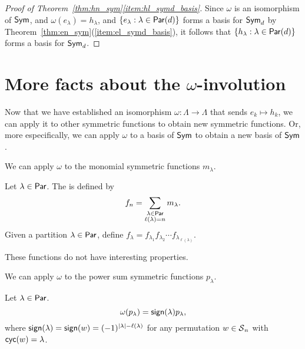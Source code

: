 \begin{proof}[Proof of Theorem~\ref{thm:hn_sym}\ref{item:hl_symd_basis}]
    Since \(\omega\) is an isomorphism of \(\operatorname{\mathsf{Sym}}\), and \(\omega(e_\lambda) = h_\lambda\), and \(\{e_\lambda : \lambda \in \operatorname{\mathsf{Par}}(d)\}\) forms a basis for \(\operatorname{\mathsf{Sym}}_d\) by Theorem~\ref{thm:en_sym}(\ref{item:el_symd_basis}), it follows that \(\{h_\lambda : \lambda \in \operatorname{\mathsf{Par}}(d)\}\) forms a basis for \(\operatorname{\mathsf{Sym}}_d\).
\end{proof}

\section{More facts about the \(\omega\)-involution}

Now that we have established an isomorphism \(\omega: \Lambda \to \Lambda\) that sends \(e_k \mapsto h_k\),
we can apply it to other symmetric functions to obtain new symmetric functions.
Or, more especifically, we can apply \(\omega\) to a basis of \(\operatorname{\mathsf{Sym}}\) to obtain a new basis of \(\operatorname{\mathsf{Sym}}\).

We can apply \(\omega\) to the monomial symmetric functions \(m_\lambda\).

\begin{definition}
		Let \(\lambda \in \operatorname{\mathsf{Par}}\).
	The  is defined by
	\begin{equation}
		f_n = \sum_{\substack{\lambda \in \operatorname{\mathsf{Par}} \\ \ell(\lambda) = n}} m_\lambda.
	\end{equation}
	Given a partition \(\lambda \in \operatorname{\mathsf{Par}}\), define \(f_\lambda = f_{\lambda_1}f_{\lambda_2}\cdots f_{\lambda_{\ell(\lambda)}}\).	
\end{definition}

These functions do not have interesting properties.

We can apply \(\omega\) to the power sum symmetric functions \(p_\lambda\).

\begin{theorem} \label{thm:omega-p-equals-pm-p}
	Let \(\lambda \in \operatorname{\mathsf{Par}}\).
	\begin{equation}
		\omega(p_\lambda) = \operatorname{\mathsf{sign}}(\lambda) p_{\lambda},
	\end{equation}
	where \(\operatorname{\mathsf{sign}}(\lambda) = \operatorname{\mathsf{sign}}(w) = (-1)^{|\lambda|-\ell(\lambda)}\) for any permutation \(w \in \operatorname{\mathcal{S}}_n\) with \(\operatorname{\mathsf{cyc}}(w) = \lambda\).
\end{theorem}

